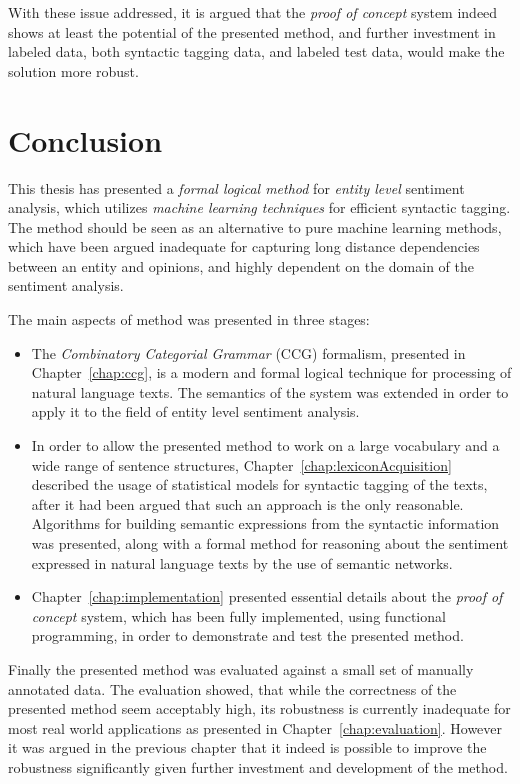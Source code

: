 With these issue addressed, it is argued that the \emph{proof of concept} system indeed shows at least the potential of the presented method, and further investment in labeled data, both syntactic tagging data, and labeled test data, would make the solution more robust.




\chapter{Conclusion}
\label{chap:conclusion}

This thesis has presented a \emph{formal logical method} for \emph{entity level} sentiment analysis, which utilizes \emph{machine learning techniques} for efficient syntactic tagging. The method should be seen as an alternative to pure machine learning methods, which have been argued inadequate for capturing long distance dependencies between an entity and opinions, and highly dependent on the domain of the sentiment analysis.

The main aspects of method was presented in three stages:%
\begin{itemize}
\item The \emph{Combinatory Categorial Grammar} (CCG) formalism,  presented in Chapter~\ref{chap:ccg}, is a modern and formal logical technique for processing of natural language texts. The semantics of the system was extended in order to apply it to the field of entity level sentiment analysis.

\item In order to allow the presented method to work on a large vocabulary and a wide range of sentence structures, Chapter~\ref{chap:lexiconAcquisition} described the usage of statistical models for syntactic tagging of the texts, after it had been argued that such an approach is the only reasonable. Algorithms for building semantic expressions from the syntactic information was presented, along with a formal method for reasoning about the sentiment expressed in natural language texts by the use of semantic networks.

\item Chapter~\ref{chap:implementation} presented essential details about the \emph{proof of concept} system, which has been fully implemented, using functional programming, in order to demonstrate and test the presented method.
\end{itemize}

Finally the presented method was evaluated against a small set of manually annotated data. The evaluation showed, that while the correctness of the presented method seem acceptably high, its robustness is currently inadequate for most real world applications as presented in Chapter~\ref{chap:evaluation}. However it was argued in the previous chapter that it indeed is possible to improve the robustness significantly given further investment and development of the method.